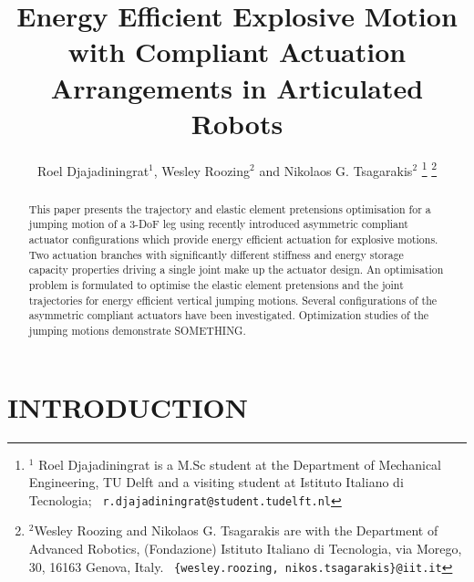 \documentclass[letterpaper, 10 pt, conference]{ieeeconf}  %
\title{\LARGE \bf
Energy Efficient Explosive Motion with Compliant Actuation Arrangements in Articulated Robots
}
\author{Roel Djajadiningrat$^{1}$, Wesley Roozing$^{2}$ and Nikolaos G. Tsagarakis$^{2}$%
\thanks{$^{1}$ Roel Djajadiningrat is a M.Sc student at the Department of Mechanical Engineering, TU Delft and a visiting student at Istituto Italiano di Tecnologia;
        {\tt\ r.djajadiningrat@student.tudelft.nl}
  }%
\thanks{$^{2}$Wesley Roozing and Nikolaos G. Tsagarakis are with the Department of Advanced Robotics,
	(Fondazione) Istituto Italiano di Tecnologia, via Morego,
	30, 16163 Genova, Italy.
        {\tt\ \{wesley.roozing, nikos.tsagarakis\}@iit.it}
     }%
}
\begin{document}
\maketitle
\thispagestyle{empty}
\pagestyle{empty}


\begin{abstract}

This paper presents the trajectory and elastic element pretensions optimisation for a jumping motion of a 3-DoF leg using recently introduced asymmetric compliant actuator configurations which provide energy efficient actuation for explosive motions. Two actuation branches
with significantly different stiffness and energy storage capacity properties driving a single joint make up the actuator design. An optimisation problem is formulated to optimise the elastic element pretensions and the joint trajectories for energy efficient vertical jumping motions. Several configurations of the asymmetric compliant actuators have been investigated. Optimization studies of the jumping motions demonstrate SOMETHING. 

\end{abstract}


\section{INTRODUCTION}
\end{document}
